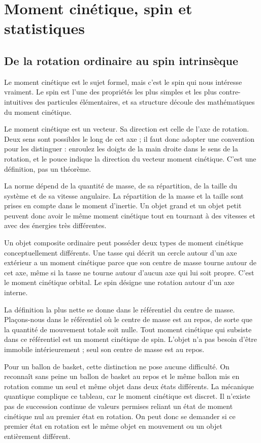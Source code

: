 \chapter{Moment cinétique, spin et statistiques}

\section{De la rotation ordinaire au spin intrinsèque}

Le moment cinétique est le sujet formel, mais c’est le spin qui nous intéresse vraiment. Le spin est l’une des propriétés les plus simples et les plus contre-intuitives des particules élémentaires, et sa structure découle des mathématiques du moment cinétique.

Le moment cinétique est un vecteur. Sa direction est celle de l’axe de rotation. Deux sens sont possibles le long de cet axe ; il faut donc adopter une convention pour les distinguer : enroulez les doigts de la main droite dans le sens de la rotation, et le pouce indique la direction du vecteur moment cinétique. C’est une définition, pas un théorème.

La norme dépend de la quantité de masse, de sa répartition, de la taille du système et de sa vitesse angulaire. La répartition de la masse et la taille sont prises en compte dans le moment d’inertie. Un objet grand et un objet petit peuvent donc avoir le même moment cinétique tout en tournant à des vitesses et avec des énergies très différentes.

Un objet composite ordinaire peut posséder deux types de moment cinétique conceptuellement différents. Une tasse qui décrit un cercle autour d’un axe extérieur a un moment cinétique parce que son centre de masse tourne autour de cet axe, même si la tasse ne tourne autour d’aucun axe qui lui soit propre. C’est le moment cinétique orbital. Le spin désigne une rotation autour d’un axe interne.

La définition la plus nette se donne dans le référentiel du centre de masse. Plaçons-nous dans le référentiel où le centre de masse est au repos, de sorte que la quantité de mouvement totale soit nulle. Tout moment cinétique qui subsiste dans ce référentiel est un moment cinétique de spin. L’objet n’a pas besoin d’être immobile intérieurement ; seul son centre de masse est au repos.

Pour un ballon de basket, cette distinction ne pose aucune difficulté. On reconnaît sans peine un ballon de basket au repos et le même ballon mis en rotation comme un seul et même objet dans deux états différents. La mécanique quantique complique ce tableau, car le moment cinétique est discret. Il n’existe pas de succession continue de valeurs permises reliant un état de moment cinétique nul au premier état en rotation. On peut donc se demander si ce premier état en rotation est le même objet en mouvement ou un objet entièrement différent.

